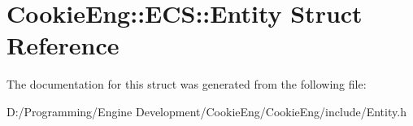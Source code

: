 \hypertarget{struct_cookie_eng_1_1_e_c_s_1_1_entity}{}\section{Cookie\+Eng\+:\+:E\+CS\+:\+:Entity Struct Reference}
\label{struct_cookie_eng_1_1_e_c_s_1_1_entity}


The documentation for this struct was generated from the following file\+:\begin{DoxyCompactItemize}
\item 
D\+:/\+Programming/\+Engine Development/\+Cookie\+Eng/\+Cookie\+Eng/include/Entity.\+h\end{DoxyCompactItemize}
